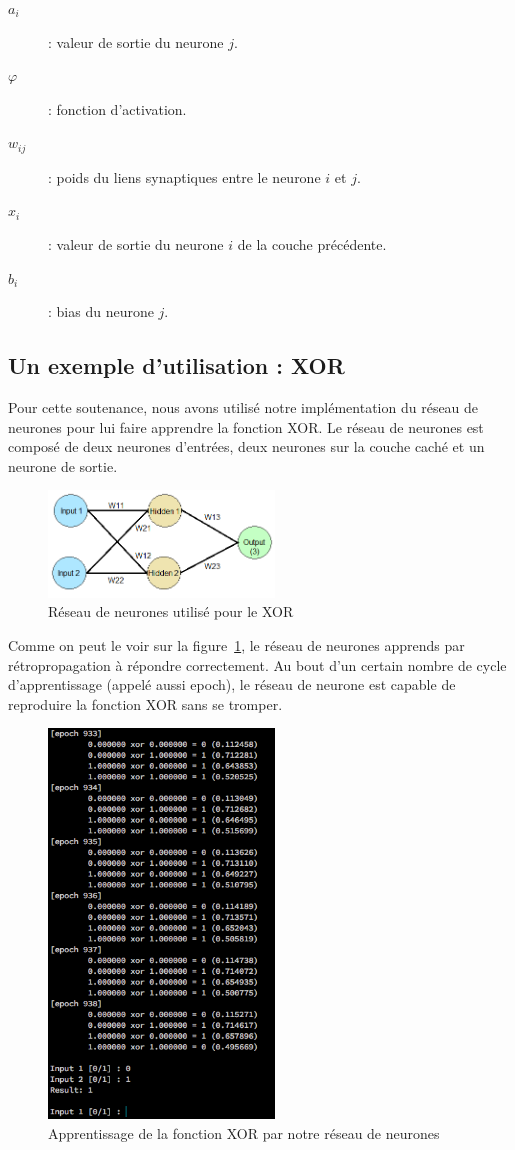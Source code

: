 \documentclass[11pt]{report}
\begin{document}
\begin{description}
\item[$a_{i}$] : valeur de sortie du neurone $j$.
\item[$\varphi$] : fonction d'activation.
\item[$w_{ij}$] : poids du liens synaptiques entre le neurone $i$ et $j$.
\item[$x_{i}$] : valeur de sortie du neurone $i$ de la couche précédente.
\item[$b_{i}$] : bias du neurone $j$.
\end{description}

\subsection{Un exemple d'utilisation : XOR}

Pour cette soutenance, nous avons utilisé notre implémentation du réseau de neurones pour lui faire apprendre la fonction XOR. Le réseau de neurones est composé de deux neurones d'entrées, deux neurones sur la couche caché et un neurone de sortie.

\begin{figure}[htbp]
\centering
\includegraphics[width=6cm]{xor_neuron.jpg}
\caption{Réseau de neurones utilisé pour le XOR}
\end{figure}

Comme on peut le voir sur la figure~\ref{xor}, le réseau de neurones apprends par rétropropagation à répondre correctement. Au bout d'un certain nombre de cycle d'apprentissage (appelé aussi epoch), le réseau de neurone est capable de reproduire la fonction XOR sans se tromper.

\begin{figure}[htbp]
\centering
\includegraphics[width=6cm]{xor.png}
\caption{Apprentissage de la fonction XOR par notre réseau de neurones}
\label{xor}
\end{figure}
\end{document}

